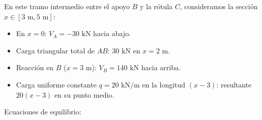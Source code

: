 


En este tramo intermedio entre el apoyo $B$ y la rótula $C$, consideramos la sección $x \in [3\text{ m}, 5\text{ m}]$:

\begin{itemize}

    \item En $x = 0$: $V_A = -30\text{ kN}$ hacia abajo.

    \item Carga triangular total de $AB$: $30\text{ kN}$ en $x = 2\text{ m}$.

    \item Reacción en $B$ ($x = 3\text{ m}$): $V_B = 140\text{ kN}$ hacia arriba.

    \item Carga uniforme constante $q = 20\text{ kN/m}$ en la longitud $(x - 3)$: resultante $20(x - 3)$ en su punto medio.

\end{itemize}



Ecuaciones de equilibrio:


